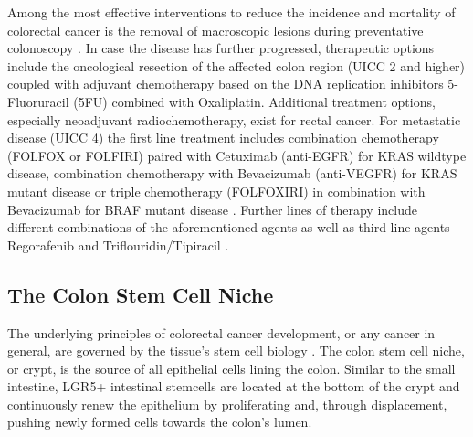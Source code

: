 \begin{flushleft}
Among the most effective interventions to reduce the incidence and mortality of colorectal cancer is the removal of macroscopic lesions during preventative colonoscopy \cite{Nishihara2013Long-TermEndoscopy}. In case the disease has further progressed, therapeutic options include the oncological resection of the affected colon region (UICC 2 and higher) coupled with adjuvant chemotherapy based on the DNA replication inhibitors 5-Fluoruracil (5FU) combined with Oxaliplatin. Additional treatment options, especially neoadjuvant radiochemotherapy, exist for rectal cancer. For metastatic disease (UICC 4) the first line treatment includes combination chemotherapy (FOLFOX or FOLFIRI) paired with Cetuximab (anti-EGFR) for KRAS wildtype disease, combination chemotherapy with Bevacizumab (anti-VEGFR) for KRAS mutant disease or triple chemotherapy (FOLFOXIRI) in combination with Bevacizumab for BRAF mutant disease \cite{vancutsemESMOConsensusGuidelines2016a}. Further lines of therapy include different combinations of the aforementioned agents as well as third line agents Regorafenib and Triflouridin/Tipiracil \cite{vancutsemESMOConsensusGuidelines2016a}. \par

\subsection{The Colon Stem Cell Niche}

The underlying principles of colorectal cancer development, or any cancer in general, are governed by the tissue's stem cell biology \cite{CleversCancerStemCell}. The colon stem cell niche, or crypt, is the source of all epithelial cells lining the colon. Similar to the small intestine, LGR5+ intestinal stemcells are located at the bottom of the crypt and continuously renew the epithelium by proliferating and, through displacement, pushing newly formed cells towards the colon's lumen.\par


\end{flushleft}
